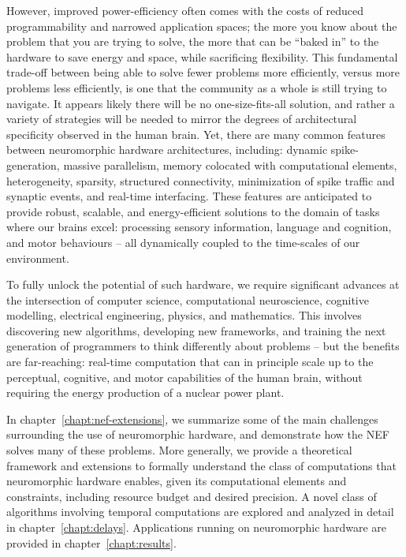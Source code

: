 However, improved power-efficiency often comes with the costs of reduced programmability and narrowed application spaces;
the more you know about the problem that you are trying to solve, the more that can be ``baked in'' to the hardware to save energy and space, while sacrificing flexibility.
This fundamental trade-off between being able to solve fewer problems more efficiently, versus more problems less efficiently, is one that the community as a whole is still trying to navigate.
It appears likely there will be no one-size-fits-all solution, and rather a variety of strategies will be needed to mirror the degrees of architectural specificity observed in the human brain.
Yet, there are many common features between neuromorphic hardware architectures, including: dynamic spike-generation, massive parallelism, memory colocated with computational elements, heterogeneity, sparsity, structured connectivity, minimization of spike traffic and synaptic events, and real-time interfacing.
These features are anticipated to provide robust, scalable, and energy-efficient solutions to the domain of tasks where our brains excel: processing sensory information, language and cognition, and motor behaviours -- all dynamically coupled to the time-scales of our environment.

To fully unlock the potential of such hardware, we require significant advances at the intersection of computer science, computational neuroscience, cognitive modelling, electrical engineering, physics, and mathematics.
This involves discovering new algorithms, developing new frameworks, and training the next generation of programmers to think differently about problems -- but the benefits are far-reaching: real-time computation that can in principle scale up to the perceptual, cognitive, and motor capabilities of the human brain, without requiring the energy production of a nuclear power plant.

In chapter~\ref{chapt:nef-extensions}, we summarize some of the main challenges surrounding the use of neuromorphic hardware, and demonstrate how the NEF solves many of these problems.
More generally, we provide a theoretical framework and extensions to formally understand the class of computations that neuromorphic hardware enables, given its computational elements and constraints, including resource budget and desired precision.
A novel class of algorithms involving temporal computations are explored and analyzed in detail in chapter~\ref{chapt:delays}.
Applications running on neuromorphic hardware are provided in chapter~\ref{chapt:results}.

